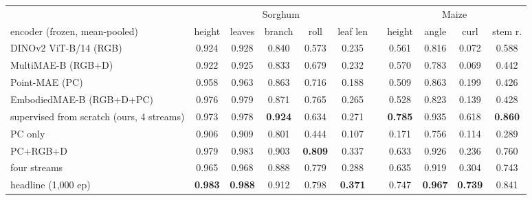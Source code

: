 \begin{table}[t]
  \centering\scriptsize
  \setlength{\tabcolsep}{2.6pt}
  \begin{tabular}{l ccc cc c cccc}
    \toprule
    & \multicolumn{5}{c}{Sorghum} & & \multicolumn{4}{c}{Maize} \\
    \cmidrule(lr){2-6}\cmidrule(lr){8-11}
    encoder (frozen, mean-pooled) & height & leaves & branch & roll & leaf len & & height & angle & curl & stem r. \\
    \midrule
    DINOv2 ViT-B/14 (RGB)~\cite{oquab2023dinov2}      & 0.924 & 0.928 & 0.840 & 0.573 & 0.235 & & 0.561 & 0.816 & 0.072 & 0.588 \\
    MultiMAE-B (RGB+D)~\cite{bachmann2022multimae}     & 0.922 & 0.925 & 0.833 & 0.679 & 0.232 & & 0.570 & 0.783 & 0.069 & 0.442 \\
    Point-MAE (PC)~\cite{pang2022pointmae}             & 0.958 & 0.963 & 0.863 & 0.716 & 0.188 & & 0.509 & 0.863 & 0.199 & 0.426 \\
    EmbodiedMAE-B (RGB+D+PC)~\cite{dong2025embodiedmae}& 0.976 & 0.979 & 0.871 & 0.765 & 0.265 & & 0.528 & 0.823 & 0.139 & 0.428 \\
    supervised from scratch (ours, 4 streams)          & 0.973 & 0.978 & \textbf{0.924} & 0.634 & 0.271 & & \textbf{0.785} & 0.935 & 0.618 & \textbf{0.860} \\
    \midrule
    \CropCode{} PC only                                & 0.906 & 0.909 & 0.801 & 0.444 & 0.107 & & 0.171 & 0.756 & 0.114 & 0.289 \\
    \CropCode{} PC+RGB+D                               & 0.979 & 0.983 & 0.903 & \textbf{0.809} & 0.337 & & 0.633 & 0.926 & 0.236 & 0.760 \\
    \CropCode{} four streams                           & 0.965 & 0.968 & 0.888 & 0.779 & 0.288 & & 0.635 & 0.919 & 0.304 & 0.743 \\
    \CropCode{} headline (1{,}000 ep)                   & \textbf{0.983} & \textbf{0.988} & 0.912 & 0.798 & \textbf{0.371} & & 0.747 & \textbf{0.967} & \textbf{0.739} & 0.841 \\

\end{tabular}
\end{table}
